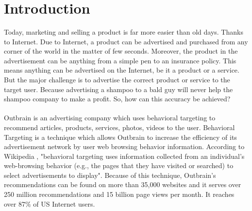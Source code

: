 \documentclass[fleqn,10pt]{SelfArx} %
\begin{document}
\flushbottom %

\maketitle %

\tableofcontents %

\thispagestyle{empty} %


\section*{Introduction} %


\paragraph{} Today, marketing and selling a product is far more easier than old days. Thanks to Internet. Due to Internet, a product can be advertised and purchased from any corner of the world in the matter of few seconds. Moreover, the product in the advertisement can be anything from a simple pen to an insurance policy. This means anything can be advertised on the Internet, be it a product or a service. But the major challenge is to advertise the correct product or service to the target user. Because advertising a shampoo to a bald guy will never help the shampoo company to make a profit. So, how can this accuracy be achieved?

\paragraph{} Outbrain is an advertising company which uses behavioral targeting to recommend articles, products, services, photos, videos to the user. Behavioral Targeting is a technique which allows Outbrain to increase the efficiency of its advertisement network by user web browsing behavior information. According to Wikipedia \cite{REF:5}, "behavioral targeting uses information collected from an individual's web-browsing behavior (e.g., the pages that they have visited or searched) to select advertisements to display". Because of this technique, Outbrain's recommendations can be found on more than 35,000 websites and it serves over 250 million recommendations and 15 billion page views per month. It reaches over 87$\%$ of US Internet users. 
\end{document}
